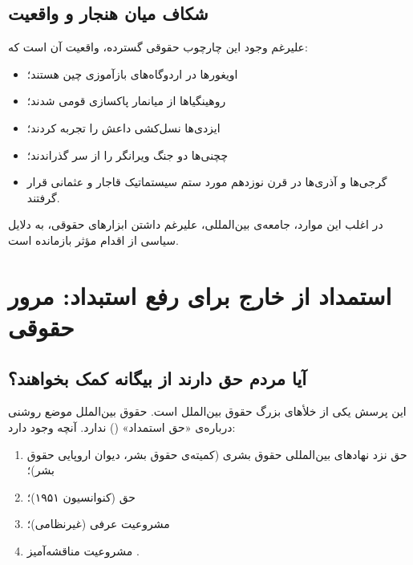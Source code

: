 \subsection{شکاف میان هنجار و واقعیت}
\label{subsec:ch03-gap}

\begin{tcolorbox}[enemybox,
	title={شکاف هنجار-واقعیت در حمایت از اقلیت‌ها}]
	علیرغم وجود این چارچوب حقوقی گسترده، واقعیت آن است که:
	\begin{itemize}[nosep, rightmargin=1em]
		\item اویغورها در اردوگاه‌های بازآموزی چین
		هستند؛
		\item روهینگیاها از میانمار پاکسازی قومی
		شدند؛
		\item ایزدی‌ها نسل‌کشی داعش را تجربه
		کردند؛
		\item چچنی‌ها دو جنگ ویرانگر را از سر
		گذراندند؛
		\item گرجی‌ها و آذری‌ها در قرن نوزدهم مورد ستم سیستماتیک
		قاجار و عثمانی قرار
		گرفتند.
	\end{itemize}
	در اغلب این موارد، جامعه‌ی بین‌المللی، علیرغم داشتن
	ابزارهای حقوقی، به دلایل سیاسی از اقدام مؤثر بازمانده است.
\end{tcolorbox}


\section{استمداد از خارج برای رفع استبداد: مرور حقوقی}
\label{sec:ch03-appeal}

\subsection{آیا مردم حق دارند از بیگانه کمک بخواهند؟}
\label{subsec:ch03-appeal-right}

این پرسش یکی از خلأهای بزرگ حقوق بین‌الملل است. حقوق بین‌الملل
موضع روشنی درباره‌ی «حق استمداد»
() ندارد.
آنچه وجود دارد:

\begin{enumerate}[label=\textbf{\arabic*.}, nosep, rightmargin=1em]
	\item حق  نزد نهادهای بین‌المللی حقوق بشری
	(کمیته‌ی حقوق بشر، دیوان اروپایی حقوق بشر)؛
	\item حق  (کنوانسیون ۱۹۵۱)؛
	\item مشروعیت عرفی 
	(غیرنظامی)؛
	\item مشروعیت مناقشه‌آمیز .
\end{enumerate}

